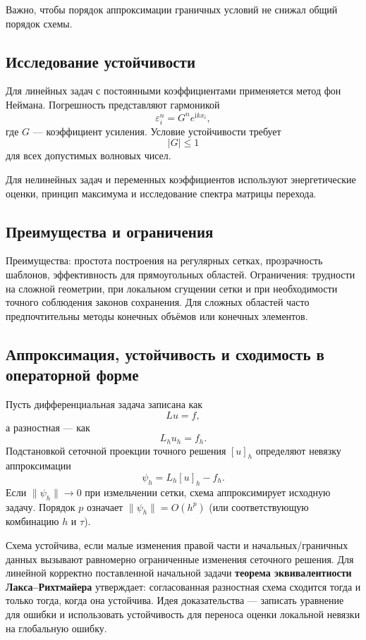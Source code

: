 Важно, чтобы порядок аппроксимации граничных условий не снижал общий порядок
схемы.

\subsection{Исследование устойчивости}

Для линейных задач с постоянными коэффициентами применяется метод фон Неймана.
Погрешность представляют гармоникой
\[
    \varepsilon_i^n=G^n e^{\mathrm{i}k x_i},
\]
где $G$ --- коэффициент усиления. Условие устойчивости требует
\[
    |G|\leq1
\]
для всех допустимых волновых чисел.

Для нелинейных задач и переменных коэффициентов используют энергетические оценки,
принцип максимума и исследование спектра матрицы перехода.

\subsection{Преимущества и ограничения}

Преимущества: простота построения на регулярных сетках, прозрачность шаблонов,
эффективность для прямоугольных областей. Ограничения: трудности на сложной
геометрии, при локальном сгущении сетки и при необходимости точного соблюдения
законов сохранения. Для сложных областей часто предпочтительны методы конечных
объёмов или конечных элементов.

\subsection{Аппроксимация, устойчивость и сходимость в операторной форме}

Пусть дифференциальная задача записана как
\[
    Lu=f,
\]
а разностная --- как
\[
    L_hu_h=f_h.
\]
Подстановкой сеточной проекции точного решения $[u]_h$ определяют невязку
аппроксимации
\[
    \psi_h=L_h[u]_h-f_h.
\]
Если $\|\psi_h\|\to0$ при измельчении сетки, схема аппроксимирует исходную задачу.
Порядок $p$ означает $\|\psi_h\|=O(h^p)$ (или соответствующую комбинацию $h$ и $\tau$).

Схема устойчива, если малые изменения правой части и начальных/граничных данных
вызывают равномерно ограниченные изменения сеточного решения. Для линейной корректно
поставленной начальной задачи \textbf{теорема эквивалентности Лакса--Рихтмайера}
утверждает: согласованная разностная схема сходится тогда и только тогда, когда она
устойчива. Идея доказательства --- записать уравнение для ошибки и использовать
устойчивость для переноса оценки локальной невязки на глобальную ошибку.


